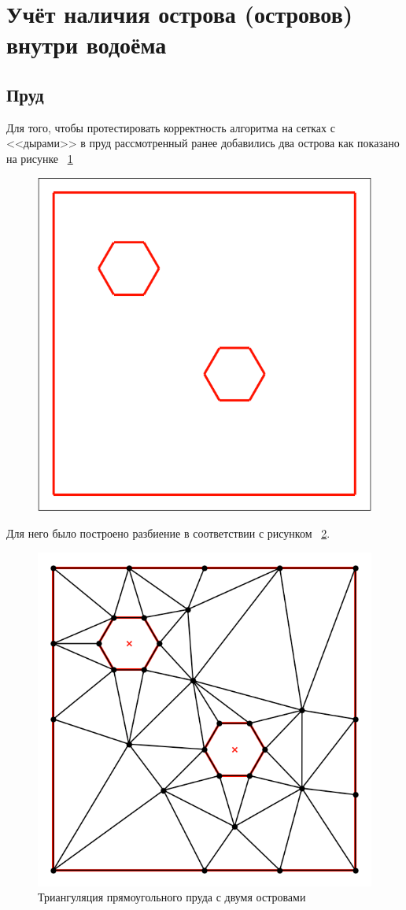 \documentclass[14pt]{extreport}
\begin{document}
\section{Учёт наличия острова (островов) внутри водоёма}


\subsection{Пруд}
Для того, чтобы протестировать корректность алгоритма на сетках с <<дырами>> в пруд рассмотренный ранее добавились два острова как показано на рисунке ~\ref{img:ex3:contour}

\begin{figure}[H]
\centerline{
\includegraphics[width=0.5\linewidth]{images/ex3/contour}}
\caption{}
\label{img:ex3:contour}
\end{figure}

Для него было построено разбиение в соответствии с рисунком ~\ref{img:ex3:mesh}.

\begin{figure}[H]
\centerline{
\includegraphics[width=0.5\linewidth]{images/ex3/mesh}}
\caption{Триангуляция прямоугольного пруда с двумя островами}
\label{img:ex3:mesh}
\end{figure}
\end{document}
